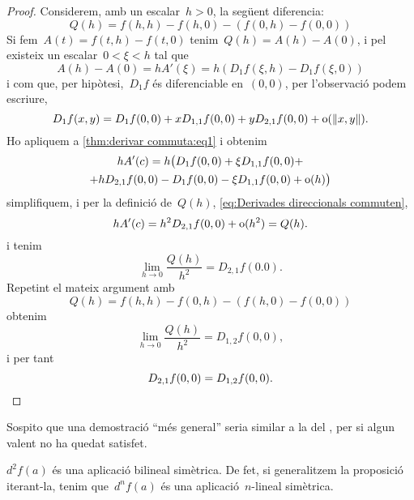 \documentclass[../../main.tex]{subfiles}
\begin{document}
\begin{theorem}
\begin{proof}
        Considerem, amb un escalar~\(h>0\), la següent diferencia:
        \begin{equation}\label{eq:Derivades direccionals commuten}
        Q(h)=f(h,h)-f(h,0)-(f(0,h)-f(0,0))
        \end{equation}
        Si fem~\(A(t)=f(t,h)-f(t,0)\) tenim~\(Q(h)=A(h)-A(0)\), i pel  existeix un escalar~\(0<\xi<h\) tal que
        \begin{equation}\label{thm:derivar commuta:eq1}
        A(h)-A(0)=hA'(\xi)=h(D_{1}f(\xi,h)-D_{1}f(\xi,0))
        \end{equation}
        i com que, per hipòtesi,~\(D_{1}f\) és diferenciable en~\((0,0)\), per l'observació  podem escriure,
        \[
            D_{1}f(x,y)=D_{1}f(0,0)+xD_{1,1}f(0,0)+yD_{2,1}f(0,0)+\omicron(\norm{x,y}).
        \]
        Ho apliquem a \eqref{thm:derivar commuta:eq1} i obtenim
        \begin{multline*}
        hA'(c)=h\big(D_{1}f(0,0)+\xi D_{1,1}f(0,0)+\\+hD_{2,1}f(0,0)-D_{1}f(0,0)-\xi D_{1,1}f(0,0)+\operatorname{o}(h)\big)
        \end{multline*}
        simplifiquem, i per la definició de~\(Q(h)\), \eqref{eq:Derivades direccionals commuten},
        \[
            hA'(c)=h^{2}D_{2,1}f(0,0)+\operatorname{o}(h^{2})=Q(h).
        \]
        i tenim
        \[
            \lim_{h\to0}\frac{Q(h)}{h^{2}}=D_{2,1}f(0.0).
        \]
        Repetint el mateix argument amb
        \[
            Q(h)=f(h,h)-f(0,h)-(f(h,0)-f(0,0))
        \]
        obtenim
        \[
            \lim_{h\to0}\frac{Q(h)}{h^{2}}=D_{1,2}f(0,0),
        \]
        i per tant
        \[
            D_{2,1}f(0,0)=D_{1,2}f(0,0).\qedhere
        \]
    \end{proof}
    \begin{note}
        Sospito que una demostració ``més general'' seria similar a la del , per si algun valent no ha quedat satisfet.
    \end{note}
    \end{theorem}
    \begin{corollary}\label{obs:diferencial bilineal}
        \(d^{2}f(a)\) és una aplicació bilineal simètrica.
        De fet, si generalitzem la proposició iterant-la, tenim que~\(d^{n}f(a)\) és una aplicació~\(n\)-lineal simètrica.
    \end{corollary}
\end{document}
